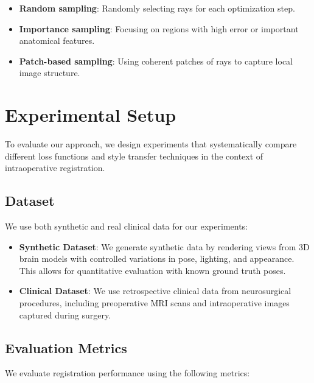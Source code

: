 \begin{itemize}
    \item \textbf{Random sampling}: Randomly selecting rays for each optimization step.
    
    \item \textbf{Importance sampling}: Focusing on regions with high error or important anatomical features.
    
    \item \textbf{Patch-based sampling}: Using coherent patches of rays to capture local image structure.
\end{itemize}

\section{Experimental Setup}

To evaluate our approach, we design experiments that systematically compare different loss functions and style transfer techniques in the context of intraoperative registration.

\subsection{Dataset}

We use both synthetic and real clinical data for our experiments:

\begin{itemize}
    \item \textbf{Synthetic Dataset}: We generate synthetic data by rendering views from 3D brain models with controlled variations in pose, lighting, and appearance. This allows for quantitative evaluation with known ground truth poses.
    
    \item \textbf{Clinical Dataset}: We use retrospective clinical data from neurosurgical procedures, including preoperative MRI scans and intraoperative images captured during surgery.
\end{itemize}

\subsection{Evaluation Metrics}

We evaluate registration performance using the following metrics:

